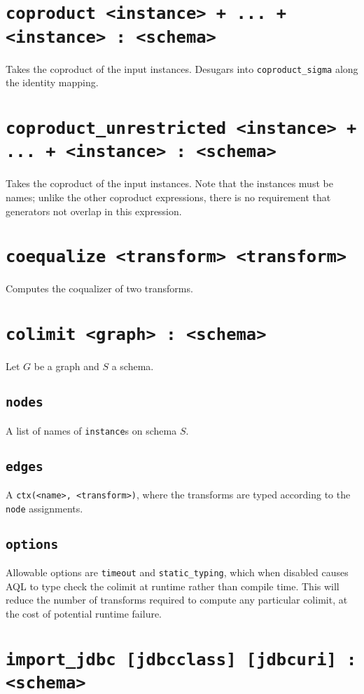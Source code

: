 \documentclass[10pt]{book}
\begin{document}
\section{{\tt coproduct <instance> + ... + <instance> : <schema>}}
Takes the coproduct of the input instances.  Desugars into {\tt coproduct\_sigma} along the identity mapping.

\section{{\tt coproduct\_unrestricted <instance> + ... + <instance> : <schema>}}
Takes the coproduct of the input instances.  Note that the instances must be names; unlike the other coproduct expressions, there is no requirement that generators not overlap in this expression.

\section{{\tt coequalize <transform> <transform>}}
Computes the coqualizer of two transforms.


\section{{\tt colimit <graph> : <schema>}}
Let $G$ be a graph and $S$ a schema.

\subsection{{\tt nodes}}
A list of names of {\tt instance}s on schema $S$.

\subsection{{\tt edges}}
A {\tt ctx(<name>, <transform>)}, where the transforms are typed according to the {\tt node} assignments.

\subsection{{\tt options}}
Allowable options are {\tt timeout} and {\tt static\_typing}, which when disabled causes AQL to type check the colimit at runtime rather than compile time.  This will reduce the number of transforms required to compute any particular colimit, at the cost of potential runtime failure.

\section{{\tt import\_jdbc [jdbcclass] [jdbcuri] : <schema>}}
\end{document}
